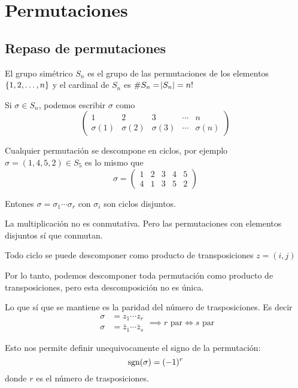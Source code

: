 \chapter{Permutaciones}

\section{Repaso de permutaciones}

El grupo simétrico $S_n$ es el grupo de las permutaciones de los elementos
$\left\{1, 2, \dots, n\right\}$ y el cardinal de $S_n$ es $\# S_n = \abs{S_n} = n!$

Si $\sigma \in S_n$, podemos escribir $\sigma$ como
\[
    \begin{pmatrix}
        1 & 2 & 3 & \cdots & n \\
        \sigma(1) & \sigma(2) & \sigma(3) & \cdots & \sigma(n)
    \end{pmatrix}
\]

Cualquier permutación se descompone en ciclos, por ejemplo
$\sigma = (1, 4, 5, 2) \in S_5$ es lo mismo que
\[
    \sigma = 
    \begin{pmatrix}
        1 & 2 & 3 & 4 & 5 \\
        4 & 1 & 3 & 5 & 2
    \end{pmatrix}
\]

Entones $\sigma = \sigma_1 \cdots \sigma_r$ con $\sigma_i$ son ciclos disjuntos.

\begin{obs}
    La multiplicación no es conmutativa. Pero las permutaciones con elementos disjuntos sí que conmutan.
\end{obs}

Todo ciclo se puede descomponer como producto de transposiciones $z = (i, j)$

Por lo tanto, podemos descomponer toda permutación como producto de transposiciones, pero esta
descomposición no es única.

Lo que sí que se mantiene es la paridad del número de trasposiciones. Es decir
\[
    \begin{aligned}
        \sigma &= z_1 \cdots z_r \\
        \sigma &= \bar{z}_1 \cdots \bar{z}_s
    \end{aligned} \implies r \text{ par} \iff s \text{ par}
\]

Esto nos permite definir unequivocamente el signo de la permutación:
\[
    \text{sgn}(\sigma) = (-1)^{r}
\]
donde $r$ es el número de trasposiciones.

